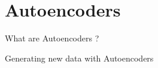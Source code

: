 \section*{Autoencoders}
\begin{frame}{What are Autoencoders ?}

\end{frame}

\begin{frame}{Generating new data with Autoencoders}
    
\end{frame}